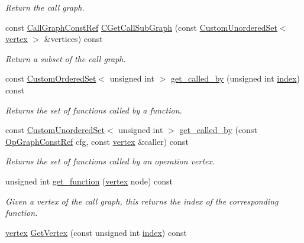 \begin{DoxyCompactItemize}
\begin{DoxyCompactList}\small\item\em Return the call graph. \end{DoxyCompactList}\item 
const \hyperlink{call__graph_8hpp_a6effd75e39674b4777714051b70eddf2}{Call\+Graph\+Const\+Ref} \hyperlink{classCallGraphManager_a8ebb15b8cc8913f918b549bb9e2ffee1}{C\+Get\+Call\+Sub\+Graph} (const \hyperlink{classCustomUnorderedSet}{Custom\+Unordered\+Set}$<$ \hyperlink{graph_8hpp_abefdcf0544e601805af44eca032cca14}{vertex} $>$ \&vertices) const
\begin{DoxyCompactList}\small\item\em Return a subset of the call graph. \end{DoxyCompactList}\item 
const \hyperlink{classCustomOrderedSet}{Custom\+Ordered\+Set}$<$ unsigned int $>$ \hyperlink{classCallGraphManager_a1ca66c62247b79f10f792b58b5bd93a0}{get\+\_\+called\+\_\+by} (unsigned int \hyperlink{tutorial__pact__2019_2Introduction_2third_2include_2Keccak_8h_a028c9bdc8344cca38ab522a337074797}{index}) const
\begin{DoxyCompactList}\small\item\em Returns the set of functions called by a function. \end{DoxyCompactList}\item 
const \hyperlink{classCustomUnorderedSet}{Custom\+Unordered\+Set}$<$ unsigned int $>$ \hyperlink{classCallGraphManager_af47e8c559960a5351867e97c30b33c66}{get\+\_\+called\+\_\+by} (const \hyperlink{op__graph_8hpp_a9a0b240622c47584bee6951a6f5de746}{Op\+Graph\+Const\+Ref} cfg, const \hyperlink{graph_8hpp_abefdcf0544e601805af44eca032cca14}{vertex} \&caller) const
\begin{DoxyCompactList}\small\item\em Returns the set of functions called by an operation vertex. \end{DoxyCompactList}\item 
unsigned int \hyperlink{classCallGraphManager_a3416f718a1d4e6232d900bc1bb08ae0e}{get\+\_\+function} (\hyperlink{graph_8hpp_abefdcf0544e601805af44eca032cca14}{vertex} node) const
\begin{DoxyCompactList}\small\item\em Given a vertex of the call graph, this returns the index of the corresponding function. \end{DoxyCompactList}\item 
\hyperlink{graph_8hpp_abefdcf0544e601805af44eca032cca14}{vertex} \hyperlink{classCallGraphManager_a68c01aa6e40aff0aebec5ee0f503346b}{Get\+Vertex} (const unsigned int \hyperlink{tutorial__pact__2019_2Introduction_2third_2include_2Keccak_8h_a028c9bdc8344cca38ab522a337074797}{index}) const

\end{DoxyCompactItemize}
